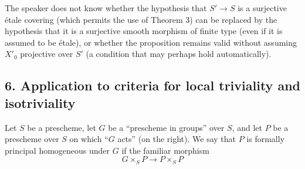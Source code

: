  The speaker does not know whether the hypothesis that
$S'\longrightarrow S$ is a surjective étale covering (which permits the use of
Theorem 3) can be replaced by the hypothesis that it is a surjective smooth
morphism of finite type (even if it is assumed to be étale), or whether the
proposition remains valid without assuming $X'_0$ projective over $S'$ (a
condition that may perhaps hold automatically).

\subsection*{6. Application to criteria for local triviality and isotriviality}

Let $S$ be a prescheme, let $G$ be a “prescheme in groups” over $S$, and let
$P$ be a prescheme over $S$ on which “$G$ acts” (on the right). We say that
$P$ is formally principal homogeneous under $G$ if the familiar morphism
\[
  G\times_SP\longrightarrow P\times_SP
\]

